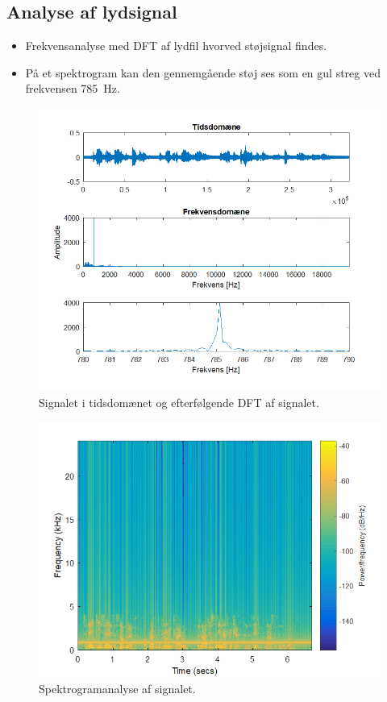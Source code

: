 \documentclass[danish]{article}
\begin{document}
\subsection{Analyse af lydsignal}
\begin{itemize}
	\item Frekvensanalyse med DFT af lydfil hvorved støjsignal findes.
	\item  På et spektrogram kan den gennemgående støj ses som en gul streg ved frekvensen \SI{785}{\hertz}.
\end{itemize}

\begin{figure}[H]
	\centering
	\includegraphics[width=0.6\linewidth]{graphics/case2_1}
	\caption{Signalet i tidsdomænet og efterfølgende DFT af signalet.}
	\label{fig:case2_1}
\end{figure}

\begin{figure}[H]
	\centering
	\includegraphics[width=0.6\linewidth]{graphics/case2_2}
	\caption{Spektrogramanalyse af signalet.}
	\label{fig:case2_2}
\end{figure}
\end{document}

